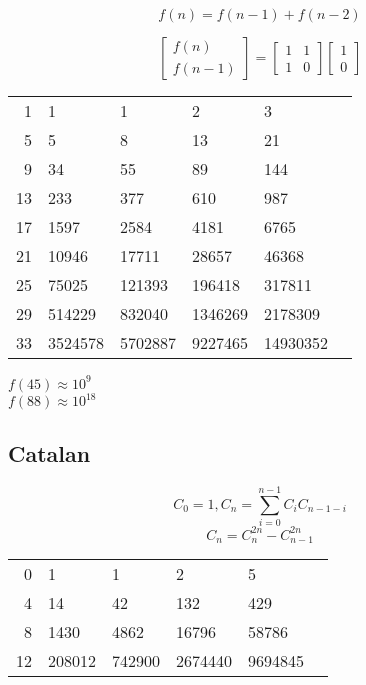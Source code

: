 \documentclass[twocolumn]{article}
\begin{document}
$$f(n)=f(n-1)+f(n-2)$$

\begin{equation*}
    \begin{bmatrix}
        f(n) \\
        f(n - 1)
    \end{bmatrix}
    =
    \begin{bmatrix}
        1 & 1 \\
        1 & 0
    \end{bmatrix}
    \begin{bmatrix}
        1 \\
        0
    \end{bmatrix}
\end{equation*}

\begin{center}
    \begin{tabular}{r|lllll}
        1 & 1 & 1 & 2 & 3 \\
        5 & 5 & 8 & 13 & 21 \\
        9 & 34 & 55 & 89 & 144 \\
        13 & 233 & 377 & 610 & 987 \\
        17 & 1597 & 2584 & 4181 & 6765 \\
        21 & 10946 & 17711 & 28657 & 46368 \\
        25 & 75025 & 121393 & 196418 & 317811 \\
        29 & 514229 & 832040 & 1346269 & 2178309 \\
        33 & 3524578 & 5702887 & 9227465 & 14930352
    \end{tabular}
\end{center}

$f(45) \approx 10^9$\\
$f(88) \approx 10^{18}$

\subsection{Catalan}

$$C_0=1, C_n=\sum_{i=0}^{n-1} C_i C_{n-1-i}$$
$$C_n=C_n^{2n}-C_{n-1}^{2n}$$

\begin{center}
    \begin{tabular}{r|lllll}
        0 & 1 & 1 & 2 & 5 \\
        4 & 14 & 42 & 132 & 429 \\
        8 & 1430 & 4862 & 16796 & 58786 \\
        12 & 208012 & 742900 & 2674440 & 9694845
    \end{tabular}
\end{center}
\end{document}
